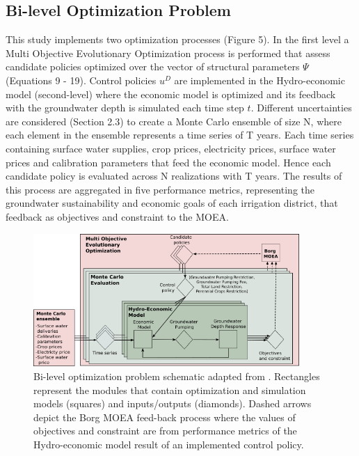 \documentclass[11pt,a4paper]{article}
\begin{document}
\subsection{Bi-level Optimization Problem}

This study implements two optimization processes (Figure 5). In the first level a Multi Objective Evolutionary Optimization process is performed that assess candidate policies optimized over the vector of structural parameters $\Psi$ (Equations 9 - 19). Control policies $u^{D}$ are implemented in the Hydro-economic model (second-level) where the economic model is optimized and its feedback with the groundwater depth is simulated each time step $t$. Different uncertainties are considered (Section 2.3) to create a Monte Carlo ensemble of size N, where each element in the ensemble represents a time series of T years. Each time series containing surface water supplies, crop prices, electricity prices, surface water prices and calibration parameters that feed the economic model. Hence each candidate policy is evaluated across N realizations with T years. The results of this process are aggregated in five performance metrics, representing the groundwater sustainability and economic goals of each irrigation district, that feedback as objectives and constraint to the MOEA. 

\begin{figure}[H]
    \centering
    \includegraphics[width=0.9\textwidth]{Diagram2}
    \caption{Bi-level optimization problem schematic adapted from \textcite{hamilton_stream_2022}. Rectangles represent the modules that contain optimization and simulation models (squares) and inputs/outputs (diamonds). Dashed arrows depict the Borg MOEA feed-back process where the values of objectives and constraint are from performance metrics of the Hydro-economic model result of an implemented control policy.}
    \label{fig:m1esh1}
\end{figure}
\end{document}
